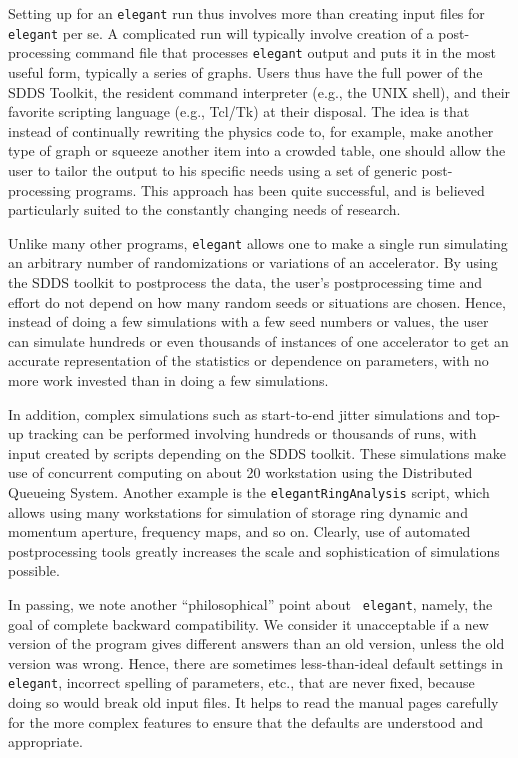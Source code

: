 \documentclass[11pt]{article}
\begin{document}
Setting up for an {\tt elegant} run thus involves more than creating
input files for {\tt elegant} per se.  A complicated run will
typically involve creation of a post-processing command file that
processes {\tt elegant} output and puts it in the most useful form,
typically a series of graphs.  Users thus have the full power of the
SDDS Toolkit, the resident command interpreter (e.g., the UNIX shell),
and their favorite scripting language (e.g., Tcl/Tk) at their
disposal. The idea is that instead of continually rewriting the
physics code to, for example, make another type of graph or squeeze
another item into a crowded table, one should allow the user to tailor
the output to his specific needs using a set of generic
post-processing programs.  This approach has been quite successful,
and is believed particularly suited to the constantly changing needs
of research.

Unlike many other programs, {\tt elegant} allows one to make a single
run simulating an arbitrary number of randomizations or variations of
an accelerator.  By using the SDDS toolkit to postprocess the data,
the user's postprocessing time and effort do not depend on how many
random seeds or situations are chosen.  Hence, instead of doing a few
simulations with a few seed numbers or values, the user can simulate
hundreds or even thousands of instances of one accelerator to get an
accurate representation of the statistics or dependence on parameters,
with no more work invested than in doing a few simulations.

In addition, complex simulations such as start-to-end jitter
simulations\cite{S2EJitter} and top-up tracking\cite{TopUpTracking}
can be performed involving hundreds or thousands of runs, with input
created by scripts depending on the SDDS toolkit.  These simulations
make use of concurrent computing on about 20 workstation using the
Distributed Queueing System\cite{DQS}.  Another example is the {\tt elegantRingAnalysis} 
script, which allows using many workstations for simulation of storage ring
dynamic and momentum aperture, frequency maps, and so on.
Clearly, use of automated
postprocessing tools greatly increases the scale and sophistication of
simulations possible.  

In passing, we note another ``philosophical'' point about {\tt
elegant}, namely, the goal of complete backward compatibility.  We
consider it unacceptable if a new version of the program gives
different answers than an old version, unless the old version was
wrong.  Hence, there are sometimes less-than-ideal default settings in
{\tt elegant}, incorrect spelling of parameters, etc., that are never
fixed, because doing so would break old input files.  It helps to read
the manual pages carefully for the more complex features to ensure that
the defaults are understood and appropriate.
\end{document}
